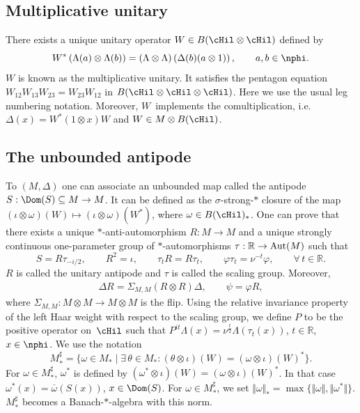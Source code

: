 \subsection*{Multiplicative unitary}
There exists a unique unitary operator $W\in
B(\cHil \otimes \cHil)$ def\/ined by
\[
W^\ast \left( \Lambda (a)\otimes  \Lambda(b) \right) = \left(
\Lambda \otimes \Lambda \right) \left( \Delta (b)(a\otimes
1)\right), \qquad a,b \in \nphi.
\]
$W$ is known as the multiplicative unitary. It satisf\/ies the
pentagon equation $W_{12}W_{13}W_{23}=W_{23}W_{12}$ in $B(\cHil
\otimes \cHil \otimes \cHil)$. Here we use the usual leg numbering notation. Moreover, $W$~implements the comultiplication, i.e.\ $\Delta(x) = W^\ast (1 \otimes x) W$ and $W \in M \otimes B(\cHil)$.

\subsection*{The unbounded antipode}

To $(M, \Delta)$ one can associate an unbounded map called the antipode $S: \Dom(S) \subseteq M \rightarrow M$. It can be def\/ined as the $\sigma$-strong-$\ast$ closure of the map $(\iota \otimes \omega)(W) \mapsto (\iota \otimes \omega)(W^\ast)$, where $\omega \in B(\cHil)_\ast$.
 One can prove that there exists a unique $\ast$-anti-automorphism $R: M \rightarrow M$ and a unique strongly continuous one-parameter group of $\ast$-automorphisms $\tau: \mathbb{R} \rightarrow {\rm Aut}(M)$ such that
\[
S = R \tau_{-i/2}, \qquad R^2 = \iota, \qquad \tau_t R = R \tau_t, \qquad \varphi \tau_t = \nu^{-t} \varphi, \qquad \forall\, t \in \mathbb{R}.
\]
$R$ is called the unitary antipode and $\tau$ is called the scaling group. Moreover,
\begin{gather}\label{EqnRCom}
\Delta R = \Sigma_{M,M} (R \otimes R) \Delta, \qquad \psi = \varphi R,
\end{gather}
where $\Sigma_{M,M}: M \otimes M \rightarrow M \otimes M$ is the f\/lip. Using the relative invariance property of the left Haar weight with respect to the scaling group, we def\/ine $P$ to be the positive operator on~$\cHil$ such that $P^{it} \Lambda(x) = \nu^{\frac{t}{2}} \Lambda(\tau_t(x))$, $t \in \mathbb{R}$, $x \in \nphi$.
 We use the notation
\[
    M_\ast^{\sharp} = \big\{ \omega \in M_\ast \mid \exists\, \theta \in M_\ast: (\theta \otimes \iota)(W) = (\omega \otimes \iota)(W)^\ast \big\}.
\]
For $\omega \in M_\ast^\sharp$, $\omega^\ast$ is def\/ined by $(\omega^\ast \otimes \iota)(W) = (\omega \otimes \iota)(W)^\ast$. In that case $\omega^\ast(x) = \overline{\omega}(S(x))$, $x \in \Dom(S)$. For $\omega \in M_\ast^\sharp$, we set $\Vert \omega \Vert_\ast = \max \{\Vert \omega \Vert, \Vert \omega^\ast \Vert \}$. $M_\ast^\sharp$ becomes a Banach-$\ast$-algebra with this norm.



